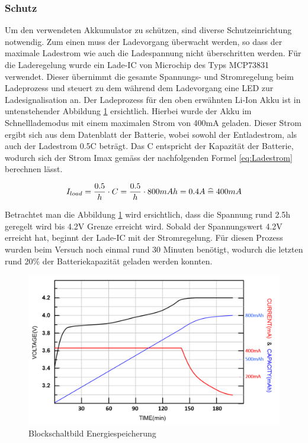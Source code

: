 \subsubsection{Schutz}\label{sec:schutz}
Um den verwendeten Akkumulator zu schützen, sind diverse Schutzeinrichtung notwendig. Zum einen muss der Ladevorgang überwacht werden, so dass der maximale Ladestrom wie auch die Ladespannung nicht überschritten werden. Für die Laderegelung wurde ein Lade-IC von Microchip des Typs MCP73831 verwendet. Dieser übernimmt die gesamte Spannungs- und Stromregelung beim Ladeprozess und steuert zu dem während dem Ladevorgang eine LED zur Ladesignalisation an. Der Ladeprozess für den oben erwähnten Li-Ion Akku ist in untenstehender Abbildung  \ref{fig:Ladekurve Li-Ion Akku} ersichtlich. Hierbei wurde der Akku im Schnelllademodus mit einem maximalen Strom von 400mA geladen. Dieser Strom ergibt sich aus dem Datenblatt der Batterie, wobei sowohl der Entladestrom, als auch der Ladestrom 0.5C beträgt. Das C entspricht der Kapazität der Batterie, wodurch sich der Strom Imax gemäss der nachfolgenden Formel \ref{eq:Ladestrom} berechnen lässt.

\begin{equation}
\centering
I_{load}={\frac{0.5}{h} \cdot C}={\frac{0.5}{h} \cdot 800mAh}=0.4A\thickspace \widehat {=} \thickspace 400mA
\label{eq:Ladestrom}
\end{equation}

Betrachtet man die Abbildung \ref{fig:Ladekurve Li-Ion Akku} wird ersichtlich, dass die Spannung rund 2.5h geregelt wird bis 4.2V Grenze erreicht wird. Sobald der Spannungswert 4.2V erreicht hat, beginnt der Lade-IC mit der Stromregelung. Für diesen Prozess wurden beim Versuch noch einmal rund 30 Minuten benötigt, wodurch die letzten rund 20$\%$ der Batteriekapazität geladen werden konnten.

\begin{figure}[H]
	\begin{center}
		\includegraphics[width=120mm]{data/LadekurveLiIon.png}
		\caption[Blockschaltbild Energiespeicherung]{Blockschaltbild Energiespeicherung} %
		\label{fig:Ladekurve Li-Ion Akku}
	\end{center}
\end{figure}


